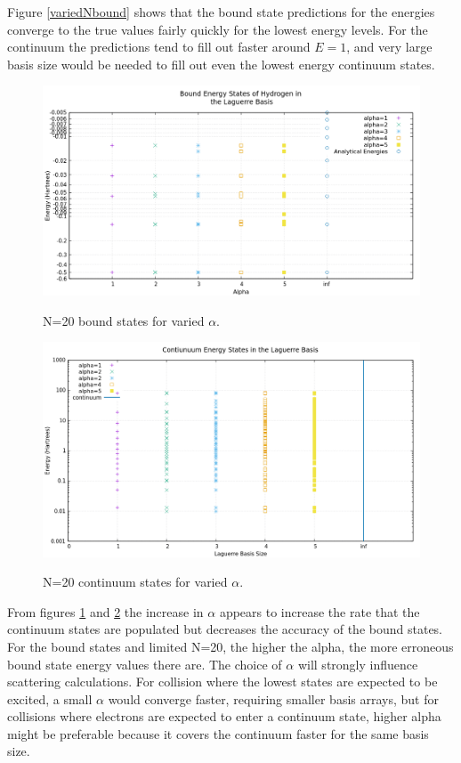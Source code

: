 \documentclass{article}
\begin{document}
	 Figure \ref{variedNbound} shows that the bound state predictions for the energies converge to the true values fairly quickly for the lowest energy levels. For the continuum the predictions tend to fill out faster around $E=1$, and very large basis size would be needed to fill out even the lowest energy continuum states. 
	
	\begin{figure}[H]
		\centering
		\includegraphics[scale=0.62]{Images/varieda.png}\\
		\caption{N=20 bound states for varied $\alpha$.}
		\label{variedalpha}
	\end{figure}
	\begin{figure}[H]
		\centering
		\includegraphics[scale=0.62]{Images/variedacont.png}\\
		\caption{N=20 continuum states for varied $\alpha$.}
		\label{variedalphacont}
	\end{figure}
	
	From figures \ref{variedalpha} and \ref{variedalphacont} the increase in $\alpha$ appears to increase the rate that the continuum states are populated but decreases the accuracy of the bound states. For the bound states and limited N=20, the higher the alpha, the more erroneous bound state energy values there are. The choice of $\alpha$ will strongly influence scattering calculations. For collision where the lowest states are expected to be excited, a small $\alpha$ would converge faster, requiring smaller basis arrays, but for collisions where electrons are expected to enter a continuum state, higher alpha might be preferable because it covers the continuum faster for the same basis size. 
	
\end{document}
